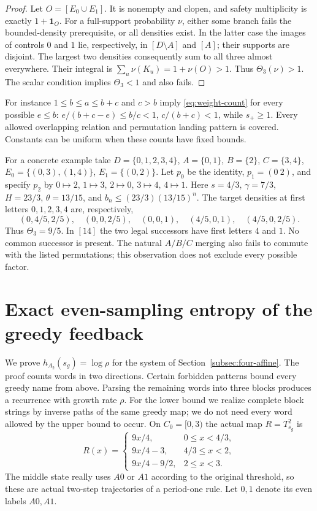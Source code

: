 \documentclass[11pt,reqno]{amsart}
\numberwithin{equation}{section}
\theoremstyle{definition}
\theoremstyle{definition}
\newcommand{\one}{\mathbf 1}
\begin{document}
\begin{proof}
Let $O=[E_0\cup E_1]$. It is nonempty and clopen, and safety
multiplicity is exactly $1+\one_O$. For a full-support probability
$\nu$, either some branch fails the bounded-density prerequisite,
or all densities exist. In the latter case the images of controls
$0$ and $1$ lie, respectively, in $[D\setminus A]$ and $[A]$;
their supports are disjoint. The largest two densities consequently
sum to all three almost everywhere. Their integral is
$\sum_u\nu(K_u)=1+\nu(O)>1$. Thus $\Theta_3(\nu)>1$.
The scalar condition implies $\Theta_3<1$ and also fails.
\end{proof}

For instance
$1\le b\le a\le b+c$ and $c>b$ imply
\eqref{eq:weight-count} for every possible $e\le b$:
$e/(b+c-e)\le b/c<1$, $c/(b+c)<1$, while $s_+\ge1$.
Every allowed overlapping relation and permutation landing pattern
is covered. Constants can be uniform when these counts have fixed
bounds.

For a concrete example take
$D=\{0,1,2,3,4\}$, $A=\{0,1\}$, $B=\{2\}$,
$C=\{3,4\}$, $E_0=\{(0,3),(1,4)\}$,
$E_1=\{(0,2)\}$. Let $p_0$ be the identity,
$p_1=(0\ 2)$, and specify $p_2$ by
$0\mapsto2$, $1\mapsto3$, $2\mapsto0$, $3\mapsto4$,
$4\mapsto1$. Here $s=4/3$, $\gamma=7/3$, $H=23/3$,
$\theta=13/15$, and
$b_n\le(23/3)(13/15)^n$. The target densities at first letters
$0,1,2,3,4$ are, respectively,
\[
 (0,4/5,2/5),\quad(0,0,2/5),\quad(0,0,1),\quad
 (4/5,0,1),\quad(4/5,0,2/5).
\]
Thus $\Theta_3=9/5$. In $[14]$ the two legal successors have
first letters $4$ and $1$. No common successor is present. The
natural $A/B/C$ merging also fails to commute with the listed
permutations; this observation does not exclude every possible factor.

\section{Exact even-sampling entropy of the greedy feedback}
\label{app:greedy}

We prove $h_{A_2}(s_g)=\log\rho$ for the system of
Section~\ref{subsec:four-affine}. The proof counts words in two
directions. Certain forbidden patterns bound every greedy name from
above. Parsing the remaining words into three blocks produces a
recurrence with growth rate $\rho$. For the lower bound we realize
complete block strings by inverse paths of the same greedy map;
we do not need every word allowed by the upper bound to occur.
On $C_0=[0,3)$ the actual map $R=T_{s_g}^2$ is
\begin{equation}\label{eq:greedy-R}
 R(x)=\begin{cases}
 9x/4,&0\le x<4/3,\\
 9x/4-3,&4/3\le x<2,\\
 9x/4-9/2,&2\le x<3.
 \end{cases}
\end{equation}
The middle state really uses $A0$ or $A1$ according to the original
threshold, so these are actual two-step trajectories of a period-one
rule. Let $0,1$ denote its even labels $A0,A1$.
\end{document}
